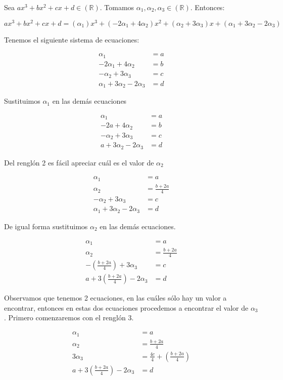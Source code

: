 \documentclass[letterpaper]{article}
\newcommand{\R}{\mathds{R}}
\renewcommand{\*}{\cdot}
\theoremstyle{definition}
\begin{document}
Sea $ax^3+bx^2+cx+d\in(\R)$. Tomamos $\alpha_{1},\alpha_{2},\alpha_{3}\in (\R)$. Entonces:

$ax^3+bx^2+cx+d = (\alpha_{1})x^3 + (-2\alpha_{1}+4\alpha_{2})x^2 + (\alpha_{2}+3\alpha_{3})x + (\alpha_{1}+3\alpha_{2}-2\alpha_{3})$

	Tenemos el siguiente sistema de ecuaciones:
	\begin{center}
		\begin{align*}
		\alpha_{1}&=a\\
		-2\alpha_{1}+4\alpha_{2}&=b\\
		-\alpha_{2}+3\alpha_{3}&=c\\
		\alpha_{1}+3\alpha_{2}-2\alpha_{3}&=d
		\end{align*}
	\end{center}
	Sustituimos $\alpha_{1}$ en las demás ecuaciones
	\begin{center}
		\begin{align*}
		\alpha_{1}&=a\\
		-2a+4\alpha_{2}&=b\\
		-\alpha_{2}+3\alpha_{3}&=c\\
		a+3\alpha_{2}-2\alpha_{3}&=d
		\end{align*}
	\end{center}
	Del renglón 2 es fácil apreciar cuál es el valor de $\alpha_{2}$
	\begin{center}
		\begin{align*}
		\alpha_{1}&=a\\
		\alpha_{2}&=\frac{b+2a}{4}\\
		-\alpha_{2}+3\alpha_{3}&=c\\
		\alpha_{1}+3\alpha_{2}-2\alpha_{3}&=d
		\end{align*}
	\end{center}
	De igual forma sustituimos $\alpha_{2}$ en las demás ecuaciones.
	\begin{center}
		\begin{align*}
		\alpha_{1}&=a\\
		\alpha_{2}&=\frac{b+2a}{4}\\
		-(\frac{b+2a}{4})+3\alpha_{3}&=c\\
		a+3(\frac{b+2a}{4})-2\alpha_{3}&=d
		\end{align*}
	\end{center}
	Observamos que tenemos 2 ecuaciones, en las cuáles sólo hay un valor a encontrar, entonces en estas dos ecuaciones procedemos a encontrar el valor de $\alpha_{3}$. Primero comenzaremos con el renglón 3.
	\begin{center}
		\begin{align*}
		\alpha_{1}&=a\\
		\alpha_{2}&=\frac{b+2a}{4}\\
		3\alpha_{3}&=\frac{4c}{4}+(\frac{b+2a}{4})\\
		a+3(\frac{b+2a}{4})-2\alpha_{3}&=d
		\end{align*}
	\end{center}
\end{document}

